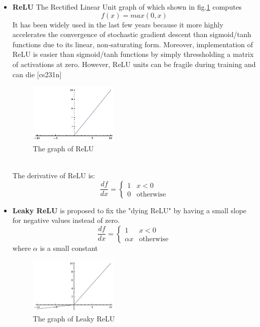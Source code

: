 \begin{itemize}
    \item \textbf{ReLU} The Rectified Linear Unit graph of which shown in fig.\ref{fig:relu} computes 
    \begin{equation}
        f(x) = max(0,x)
    \end{equation}
    It has been widely used in the last few years because it more highly accelerates the convergence of stochastic gradient descent than sigmoid/tanh functions due to its linear, non-saturating form. Moreover, implementation of ReLU is easier than sigmoid/tanh functions by simply thressholding a matrix of activations at zero. However, ReLU units can be fragile during training and can die [cs231n]
    \begin{figure}[th!]
        \centering
        \includegraphics[width=0.4\textwidth]{Chapters/Fig/relu.jpg}
        \caption{The graph of ReLU}
        \label{fig:relu}
    \end{figure}\\
    The derivative of ReLU is:
    \begin{equation}
        \frac{df}{dx} = \begin{cases}
            1 & x < 0\\
            0 & \mbox{otherwise}
        \end{cases}
    \end{equation}
    \item \textbf{Leaky ReLU} is proposed to fix the "dying ReLU" by having a small slope for negative values instead of zero.
        \begin{equation}
        \frac{df}{dx} = \begin{cases}
            1 & x < 0\\
            \alpha x & \mbox{otherwise}
        \end{cases}
    \end{equation}
    where $\alpha$ is a small constant
    \begin{figure}[h!]
        \centering
        \includegraphics[width=0.4\textwidth]{Chapters/Fig/leaky.jpeg}
        \caption{The graph of Leaky ReLU}
        \label{fig:lrelu}
    \end{figure}
\end{itemize}

